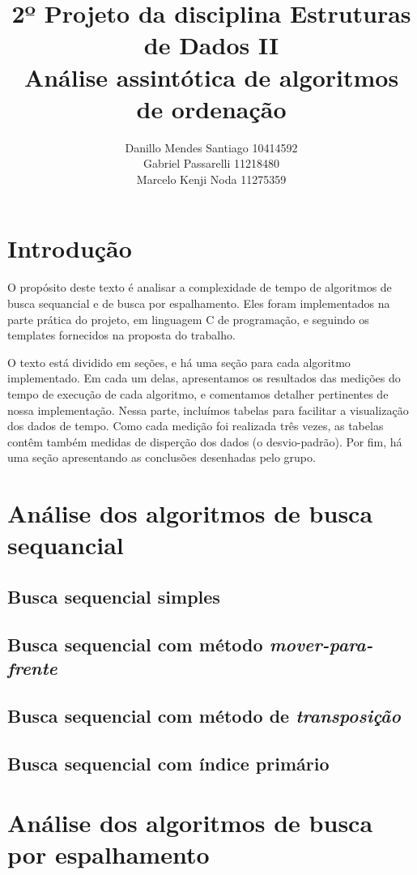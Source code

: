 \documentclass{article}
\title{%
    2º Projeto da disciplina Estruturas de Dados II \\
     \large Análise assintótica de algoritmos de ordenação}
\author{Danillo Mendes Santiago 10414592\\Gabriel Passarelli 11218480\\ Marcelo Kenji Noda 11275359}
\begin{document}
%
\maketitle
%
\section{Introdução}
O propósito deste texto é analisar a complexidade de tempo de algoritmos de busca sequancial e de busca por espalhamento. Eles foram implementados na parte prática do projeto, em linguagem C de programação, e seguindo os templates fornecidos na proposta do trabalho.\par
%
O texto está dividido em seções, e há uma seção para cada algoritmo implementado. Em cada um delas, apresentamos os resultados das medições do tempo de execução de cada algoritmo, e comentamos detalher pertinentes de nossa implementação. Nessa parte, incluímos tabelas para facilitar a visualização dos dados de tempo. Como cada medição foi realizada três vezes, as tabelas contêm também medidas de disperção dos dados (o desvio-padrão). Por fim, há uma seção apresentando as conclusões desenhadas pelo grupo.
%
\section{Análise dos algoritmos de busca sequancial}
\subsection{Busca sequencial simples}
%
%
%
\subsection{Busca sequencial com método \textit{mover-para-frente}}
%
%
%
\subsection{Busca sequencial com método de \textit{transposição}}
%
%
%
\subsection{Busca sequencial com índice primário}
%
%
%
\section{Análise dos algoritmos de busca por espalhamento}
\end{document}

